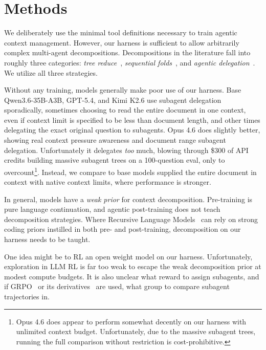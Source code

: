 \section{Methods}
\label{methods}

We deliberately use the minimal tool definitions necessary to train agentic context management. However, our harness is sufficient to allow arbitrarily complex multi-agent decompositions. Decompositions in the literature fall into roughly three categories: \emph{tree reduce}~\citep{wu2021recursive,sarthi2024raptor,zhang2022summn}, \emph{sequential folds}~\citep{yu2025memagent,zhang2024coa}, and \emph{agentic delegation}~\citep{zhang2025rlm,kimiteam2026kimik25,anthropic2025multiagent}. We utilize all three strategies.

Without any training, models generally make poor use of our harness. Base Qwen3.6-35B-A3B, GPT-5.4, and Kimi K2.6 use subagent delegation sporadically, sometimes choosing to read the entire document in one context, even if context limit is specified to be less than document length, and other times delegating the exact original question to subagents. Opus 4.6 does slightly better, showing real context pressure awareness and document range subagent delegation. Unfortunately it delegates \emph{too} much, blowing through \$300 of API credits building massive subagent trees on a 100-question eval, only to overcount\footnote{Opus 4.6 does appear to perform somewhat decently on our harness with unlimited context budget. Unfortunately, due to the massive subagent trees, running the full comparison without restriction is cost-prohibitive.}. Instead, we compare to base models supplied the entire document in context with native context limits, where performance is stronger.

In general, models have a \emph{weak prior} for context decomposition. Pre-training is pure language continuation, and agentic post-training does not teach decomposition strategies. Where Recursive Language Models~\citep{zhang2025rlm} can rely on strong coding priors instilled in both pre- and post-training, decomposition on our harness needs to be taught.

One idea might be to RL an open weight model on our harness. Unfortunately, exploration in LLM RL is far too weak to escape the weak decomposition prior at modest compute budgets. It is also unclear what reward to assign subagents, and if GRPO~\citep{shao2024deepseekmath} or its derivatives~\citep{yu2025dapo,liu2025drgrpo,zheng2025gspo} are used, what group to compare subagent trajectories in.

